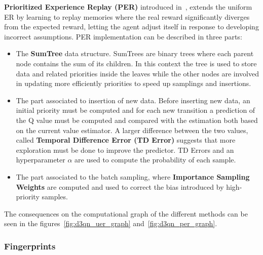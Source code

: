 \documentclass[11pt, a4paper, hidelinks]{report}
\begin{document}
\textbf{Prioritized Experience Replay (PER)} introduced in~\citep{prioritized}, extends the uniform ER by learning to replay memories where the real reward significantly diverges from the expected reward, letting the agent adjust itself in response to developing incorrect assumptions.
PER implementation can be described in three parts:
\begin{itemize}
	\item The \textbf{SumTree} data structure.
SumTrees are binary trees where each parent node contains the sum of its children.
In this context the tree is used to store data and related priorities inside the leaves while the other nodes are involved in updating more efficiently priorities to speed up samplings and insertions.
	\item The part associated to insertion of new data.
Before inserting new data, an initial priority must be computed and for each new transition a prediction of the Q value must be computed and compared with the estimation both based on the current value estimator.
A larger difference between the two values, called \textbf{Temporal Difference Error (TD Error)} suggests that more exploration must be done to improve the predictor.
TD Errors and an hyperparameter $\alpha$ are used to compute the probability of each sample.
	\item The part associated to the batch sampling, where \textbf{Importance Sampling Weights} are computed and used to correct the bias introduced by high-priority samples.
\end{itemize}
The consequences on the computational graph of the different methods can be seen in the figures~\ref{fig:d3qn_uer_graph} and~\ref{fig:d3qn_per_graph}.

\subsubsection{Fingerprints}\label{subsubsec:fingerprints}
\end{document}
